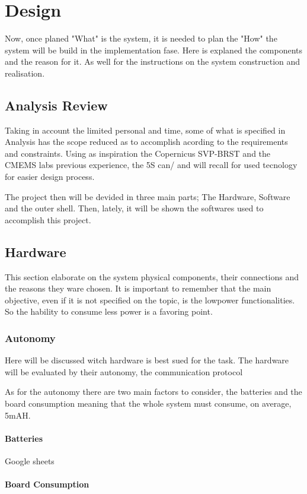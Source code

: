 \chapter{Design}
Now, once planed "What" is the system, it is needed to plan the "How" the system will be build in 
the implementation fase. Here is explaned the components and the reason for it. As well
for the instructions on the system construction and realisation.

\section{Analysis Review}

Taking in account the limited personal and time, some of what is specified in Analysis
has the scope reduced as to accomplish acording to the requirements and constraints.
Using as inspiration the Copernicus SVP-BRST and the CMEMS labs previous experience,
the 5S can/ and will recall for used tecnology for easier design process.

The project then will be devided in three main parts; The Hardware, Software and the outer shell.
Then, lately, it will be shown the softwares used to accomplish this project. 

\section{Hardware}

This section elaborate on the system physical components, their connections and the 
reasons they ware chosen. It is important to remember that the main objective, even if 
it is not specified on the topic, is the lowpower functionalities. So the hability to
consume less power is a favoring point. 


\subsection{Autonomy}
Here will be discussed witch hardware is best sued for the task. The hardware will be evaluated by their
autonomy, the communication protocol

As for the autonomy there are two main factors to consider, the batteries and the board consumption
meaning that the whole system must consume, on average, 5mAH.
\subsubsection{Batteries}
Google sheets
\subsubsection{Board Consumption}

